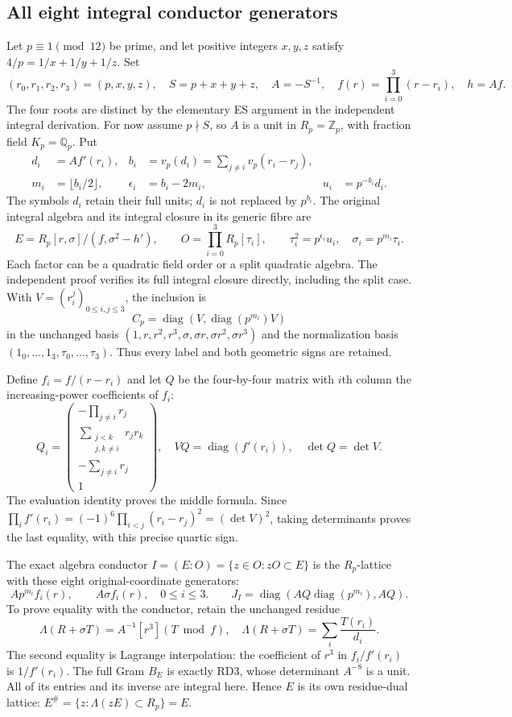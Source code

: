 \documentclass[11pt]{article}
\newcommand{\diag}{\operatorname{diag}}
\begin{document}
\subsection{All eight integral conductor generators}
Let $p\equiv1\pmod {12}$ be prime, and let positive integers $x,y,z$
satisfy $4/p=1/x+1/y+1/z$. Set
\[
 (r_0,r_1,r_2,r_3)=(p,x,y,z),\quad
 S=p+x+y+z,\quad A=-S^{-1},\quad
 f(r)=\prod_{i=0}^3(r-r_i),\quad h=Af .
 \tag{PS1}
\]
The four roots are distinct by the elementary ES argument in the
independent integral derivation. For now assume $p\nmid S$, so $A$
is a unit in $R_p=\mathbb Z_p$, with fraction field $K_p=\mathbb Q_p$.
Put
\[
 \begin{aligned}
 d_i&=Af'(r_i),&
 b_i&=v_p(d_i)=\sum_{j\ne i}v_p(r_i-r_j),\\
 m_i&=\lfloor b_i/2\rfloor,&
 \epsilon_i&=b_i-2m_i,&u_i&=p^{-b_i}d_i .
 \end{aligned}
 \tag{PS2}
\]
The symbols $d_i$ retain their full units; $d_i$ is not replaced by $p^{b_i}$.
The original integral algebra and its integral closure in its generic
fibre are
\[
 E=R_p[r,\sigma]/(f,\sigma^2-h'),\qquad
 O=\prod_{i=0}^3R_p[\tau_i],\qquad
 \tau_i^2=p^{\epsilon_i}u_i,\quad \sigma_i=p^{m_i}\tau_i .
 \tag{PS3}
\]
Each factor can be a quadratic field order or a split quadratic algebra.
The independent proof verifies its full integral closure directly, including
the split case. With $V=(r_i^j)_{0\le i,j\le3}$, the inclusion is
\[
 C_p=\diag(V,\diag(p^{m_i})V)
 \tag{PS4}
\]
in the unchanged basis $(1,r,r^2,r^3,\sigma,\sigma r,\sigma r^2,\sigma r^3)$
and the normalization basis $(1_0,\ldots,1_3,\tau_0,\ldots,\tau_3)$.
Thus every label and both geometric signs are retained.

Define $f_i=f/(r-r_i)$ and let $Q$ be the four-by-four matrix with
$i$th column the increasing-power coefficients of $f_i$:
\[
 Q_i=\begin{pmatrix}
 -\prod_{j\ne i}r_j\\
 \sum_{\substack{j<k\\j,k\ne i}}r_jr_k\\
 -\sum_{j\ne i}r_j\\1
 \end{pmatrix},\quad
 VQ=\diag(f'(r_i)),\quad\det Q=\det V .
 \tag{PS5}
\]
The evaluation identity proves the middle formula. Since
$\prod_i f'(r_i)=(-1)^6\prod_{i<j}(r_i-r_j)^2=(\det V)^2$,
taking determinants proves the last equality, with this precise quartic sign.

The exact algebra conductor $I=(E:O)=\{z\in O:zO\subset E\}$ is the
$R_p$-lattice with these eight original-coordinate generators:
\[
 \boxed{A p^{m_i}f_i(r),\qquad A\sigma f_i(r),\quad0\le i\le3.}
 \qquad
 J_I=\diag(AQ\diag(p^{m_i}),AQ).
 \tag{PS6}
\]
To prove equality with the conductor, retain the unchanged residue
\[
 \Lambda(R+\sigma T)=A^{-1}[r^3](T\bmod f),\quad
 \Lambda(R+\sigma T)=\sum_i\frac{T(r_i)}{d_i}.
 \tag{PS7}
\]
The second equality is Lagrange interpolation: the coefficient of $r^3$
in $f_i/f'(r_i)$ is $1/f'(r_i)$. The full Gram $B_E$ is exactly RD3,
whose determinant $A^{-8}$ is a unit. All of its entries and its inverse
are integral here. Hence $E$ is its own residue-dual lattice:
$E^\#=\{z:\Lambda(zE)\subset R_p\}=E$.
\end{document}
